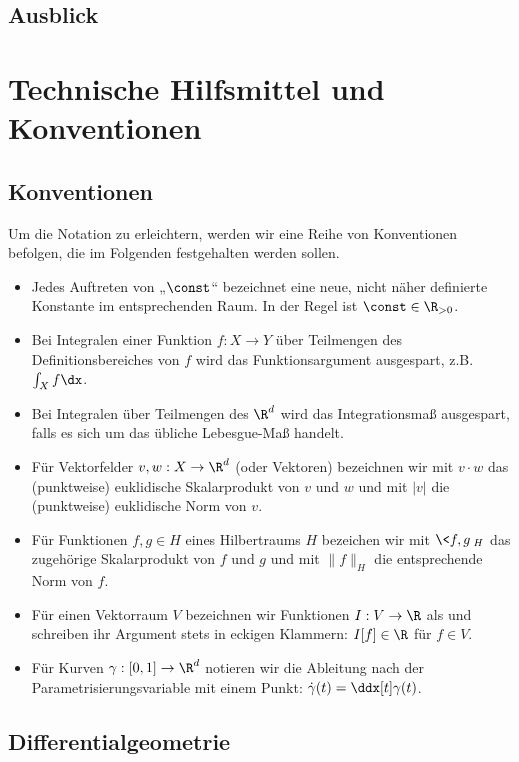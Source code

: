 \documentclass{mythesis}
\begin{document}
\section{Ausblick}




\chapter{Technische Hilfsmittel und Konventionen}


\section*{Konventionen}

Um die Notation zu erleichtern, werden wir eine Reihe von Konventionen befolgen, die im Folgenden festgehalten werden sollen.

\begin{itemize}
    \item
	Jedes Auftreten von „$\const$“ bezeichnet eine neue, nicht näher definierte Konstante im entsprechenden Raum.
	In der Regel ist $\const \in \R_{>0}$.
    \item
	Bei Integralen einer Funktion $f: X \to Y$ über Teilmengen des Definitionsbereiches von $f$ wird das Funktionsargument ausgespart, z.B. $\int_X f \dx$.
    \item
	Bei Integralen über Teilmengen des $\R^d$ wird das Integrationsmaß ausgespart, falls es sich um das übliche Lebesgue-Maß handelt.
    \item
	Für Vektorfelder $v, w: X \to \R^d$ (oder Vektoren) bezeichnen wir mit $v \cdot w$ das (punktweise) euklidische Skalarprodukt von $v$ und $w$ und mit $|v|$ die (punktweise) euklidische Norm von $v$.
    \item
	Für Funktionen $f, g \in H$ eines Hilbertraums $H$ bezeichen wir mit $\<f, g\>_H$ das zugehörige Skalarprodukt von $f$ und $g$ und mit $\|f\|_H$ die entsprechende Norm von $f$.
    \item
	Für einen Vektorraum $V$ bezeichnen wir Funktionen $I: V \to \R$ als  und schreiben ihr Argument stets in eckigen Klammern: $I[f] \in \R$ für $f \in V$.
    \item
	Für Kurven $\gamma: [0,1] \to \R^d$ notieren wir die Ableitung nach der Parametrisierungsvariable mit einem Punkt: $\dot \gamma(t) = \ddx[t] \gamma(t)$.
\end{itemize}


\section*{Differentialgeometrie}
\end{document}
